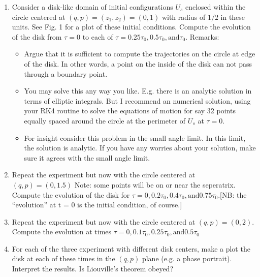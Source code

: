 \begin{enumerate}
\item Consider a disk-like domain of initial configurations $U_s$ enclosed
within the circle centered at $(q,p)=(z_1,z_2)=(0,1)$ with radius
of $1/2$ in these units. See Fig. 1 for a plot of these initial conditions. Compute the evolution of the disk from $\tau=0$ to each of $\tau=0.25\tau_0,0.5\tau_0,\mathrm{and}\tau_0$.
Remarks:
    \begin{itemize}
    \item Argue that it is sufficient to compute the trajectories on the
    circle at edge of the disk. In other words, a point on the inside
    of the disk can not pass through a boundary point.
    \item You may solve this any way you like. E.g. there is an analytic
    solution in terms of elliptic integrals. But I recommend an
    numerical solution, using your RK4 routine to solve the equations of motion for say 32 points equally spaced around the
    circle at the perimeter of $U_s$ at $\tau = 0$.
    \item For insight consider this problem in the small angle limit. In
    this limit, the solution is analytic. If you have any worries
    about your solution, make sure it agrees with the small angle limit.
    \end{itemize}
\item Repeat the experiment but now with the circle centered at $(q,p)=(0,1.5)$ Note: some points will be on or near the seperatrix. Compute the evolution of the disk for $\tau=0,0.2\tau_0,0.4\tau_0,\mathrm{and}0.75\tau_0$.[NB: the “evolution” at t = 0 is the initial condition, of course.]
\item Repeat the experiment but now with the circle centered at  $(q,p)=(0,2)$. Compute the evolution at times $\tau=0,0.1\tau_0,0.25\tau_0,\mathrm{and}0.5\tau_0$ 
\item For each of the three experiment with different disk centers, make
a plot the disk at each of these times in the $(q,p)$ plane (e.g.
a phase portrait). Interpret the results. Is Liouville’s theorem obeyed?
\end{enumerate}






